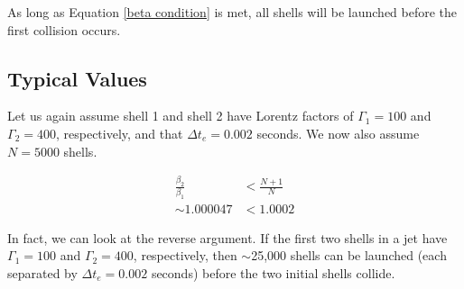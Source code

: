 \documentclass[10pt]{article}
\begin{document}
As long as Equation \ref{beta condition} is met, all shells will be launched before the first collision occurs. 

\subsection*{Typical Values}

Let us again assume shell 1 and shell 2 have Lorentz factors of $\Gamma_1=100$ and $\Gamma_2=400$, respectively, and that $\Delta t_e = 0.002$ seconds. We now also assume $N=5000$ shells.

\begin{align}
	\frac{\beta_2}{\beta_1} &< \frac{N+1}{N} \\
	\sim1.000047 &< 1.0002
\end{align}

In fact, we can look at the reverse argument. If the first two shells in a jet have $\Gamma_1=100$ and $\Gamma_2=400$, respectively, then $\sim$25,000 shells can be launched (each separated by $\Delta t_e = 0.002$ seconds) before the two initial shells collide.
\end{document}
